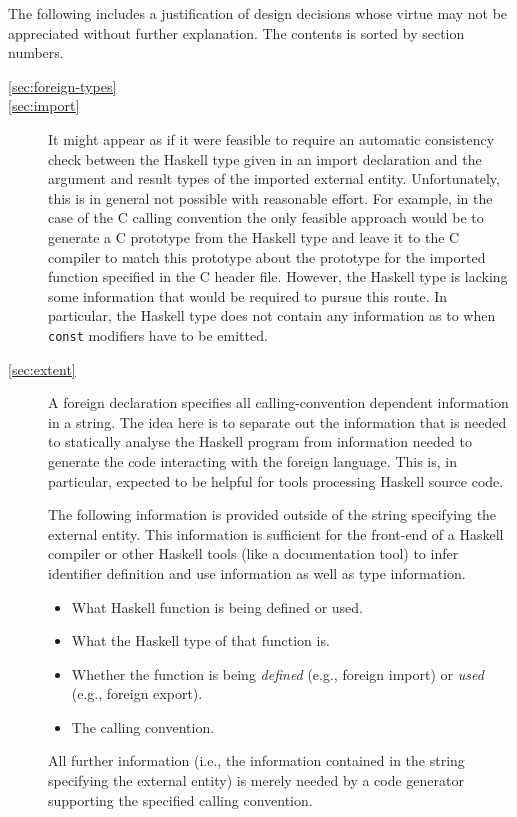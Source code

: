 \documentclass[a4paper,twosides]{article}
\newcommand{\code}[1]{\texttt{#1}}
\begin{document}
The following includes a justification of design decisions whose virtue may
not be appreciated without further explanation.  The contents is sorted by
section numbers.
%
\begin{description}
\item[\ref{sec:foreign-types}] 
\item[\ref{sec:import}] It might appear as if it were feasible to
  require an automatic consistency check between the Haskell type given in an
  import declaration and the argument and result types of the imported
  external entity.  Unfortunately, this is in general not possible with
  reasonable effort.  For example, in the case of the C calling convention the
  only feasible approach would be to generate a C prototype from the Haskell
  type and leave it to the C compiler to match this prototype about the
  prototype for the imported function specified in the C header file.
  However, the Haskell type is lacking some information that would be required
  to pursue this route.  In particular, the Haskell type does not contain any
  information as to when \code{const} modifiers have to be emitted.
\item[\ref{sec:extent}] A foreign declaration specifies all calling-convention
  dependent information in a string.  The idea here is to separate out the
  information that is needed to statically analyse the Haskell program from
  information needed to generate the code interacting with the foreign
  language.  This is, in particular, expected to be helpful for tools
  processing Haskell source code.

  The following information is provided outside of the
  string specifying the external entity.  This information is sufficient for
  the front-end of a Haskell compiler or other Haskell tools (like a
  documentation tool) to infer identifier definition and use information as
  well as type information.
  \begin{itemize}
  \item What Haskell function is being defined or used.
  \item What the Haskell type of that function is.
  \item Whether the function is being \emph{defined} (e.g., foreign import) or
    \emph{used} (e.g., foreign export).
  \item The calling convention.
  \end{itemize}
  All further information (i.e., the information contained in the string
  specifying the external entity) is merely needed by a code generator
  supporting the specified calling convention.
  

\end{description}
\end{document}
